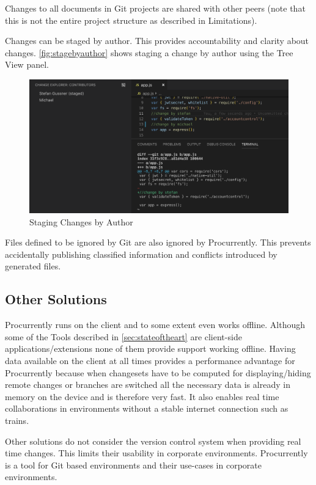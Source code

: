 Changes to all documents in Git projects are shared with other peers (note that this is not the entire project structure as described in Limitations).

Changes can be staged by author. This provides accountability and clarity about changes. \autoref{fig:stagebyauthor} shows staging a change by author using the Tree View panel. 

\begin{figure}[hb]
    \centering
    \includegraphics[width=150mm]{figures/screenshots/stage-by-author.png}
	\caption{Staging Changes by Author}
    \label{fig:stagebyauthor}
\end{figure}

Files defined to be ignored by Git are also ignored by Procurrently. This prevents accidentally publishing classified information and conflicts introduced by generated files. 

\subsection{Other Solutions}
Procurrently runs on the client and to some extent even works offline. Although some of the Tools described in \autoref{sec:stateoftheart} are client-side applications/extensions none of them provide support working offline. Having data available on the client at all times provides a performance advantage for Procurrently because when changesets have to be computed for displaying/hiding remote changes or branches are switched all the necessary data is already in memory on the device and is therefore very fast. It also enables real time collaborations in environments without a stable internet connection such as trains.

Other solutions do not consider the version control system when providing real time changes. This limits their usability in corporate environments. Procurrently is a tool for Git based environments and their use-cases in corporate environments. 

